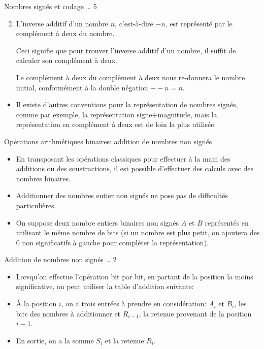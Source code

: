 \documentclass[presentation]{beamer}
\begin{document}
\begin{frame}[label={sec:orga1d1ad4}]{Nombres signés et codage \ldots{} 5}
\begin{enumerate}
\setcounter{enumi}{1}
\item L'inverse additif d'un nombre \(n\), c'est-à-dire \(-n\), est représenté par le \alert{complément à deux} du nombre.

Ceci signifie que pour trouver l'inverse additif d'un nombre, il suffit de calculer son complément à deux.

Le complément à deux du complément à deux nous re-donnera le nombre initial, conformément à la double négation \(--n = n\).
\end{enumerate}
\begin{itemize}
\item Il existe d'autres conventions pour la représentation de nombres signés, comme par exemple, la représentation signe+magnitude, mais la représentation en complément à deux est de loin la plus utilisée.
\end{itemize}
\end{frame}

\begin{frame}[label={sec:org23bcb4c}]{Opérations arithmétiques binaires: addition de nombres non signés}
\begin{itemize}
\item En transposant les opérations classiques pour effectuer à la main des additions ou des soustractions, il est possible d'effectuer des calculs avec des nombres binaires.

\item Additionner des nombres entier non signés ne pose pas de difficultés particulières.

\item On suppose deux nombre entiers binaires non signés \(A\) et \(B\) représentés en utilisant le même nombre de bits (si un nombre est plus petit, on ajoutera des 0 non significatifs à gauche pour compléter la représentation).
\end{itemize}
\end{frame}


\begin{frame}[label={sec:org219d010}]{Addition de nombres non signés \ldots{} 2}
\begin{itemize}
\item Lorsqu'on effectue l'opération bit par bit, en partant de la position la moins significative, on peut utiliser la table d'addition suivante:

\item À la position \(i\), on a trois entrées à prendre en considération: \(A_{i}\) et \(B_{i}\), les bits des nombres à additionner et \(R_{i-1}\), la retenue provenant de la position \(i-1\).

\item En sortie, on a la somme \(S_{i}\) et la retenue \(R_{i}\).
\end{itemize}
\end{frame}
\end{document}
